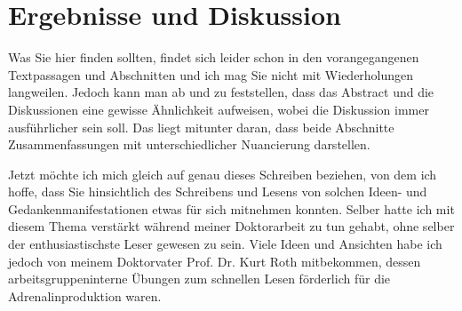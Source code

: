 \section{Ergebnisse und Diskussion}





Was Sie hier finden sollten, findet sich leider schon in den vorangegangenen
Textpassagen und Abschnitten und ich mag Sie nicht mit Wiederholungen
langweilen. Jedoch kann man ab und zu feststellen, dass das Abstract und
die Diskussionen eine gewisse Ähnlichkeit aufweisen, wobei die Diskussion
immer ausführlicher sein soll. Das liegt mitunter daran, dass beide
Abschnitte Zusammenfassungen mit unterschiedlicher Nuancierung darstellen.

Jetzt möchte ich mich gleich auf genau dieses Schreiben beziehen,
von dem ich hoffe, dass Sie hinsichtlich des Schreibens und Lesens
von solchen Ideen- und Gedankenmanifestationen etwas für sich mitnehmen konnten.
Selber hatte ich mit diesem Thema verstärkt während meiner Doktorarbeit \cite{Gerhards2008}
zu tun gehabt, ohne selber der enthusiastischste Leser gewesen zu sein.
Viele Ideen und Ansichten habe ich jedoch von meinem Doktorvater
Prof. Dr. Kurt Roth mitbekommen, dessen arbeitsgruppeninterne Übungen
zum schnellen Lesen förderlich für die Adrenalinproduktion waren.

